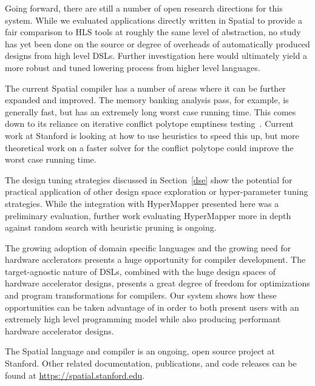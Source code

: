 Going forward, there are still a number of open research directions for this system.
While we evaluated applications directly written in Spatial to provide a fair
comparison to HLS tools at roughly the same level of abstraction, no study has yet
been done on the source or degree of overheads of automatically produced designs
from high level DSLs. Further investigation here would ultimately yield a more robust
and tuned lowering process from higher level languages.

The current Spatial compiler has a number of areas where it can be further expanded and
improved. The memory banking analysis pass, for example, is generally fast, but has
an extremely long worst case running time. This comes down to its reliance on
iterative conflict polytope emptiness testing~\cite{Wang_banking}. Current work
at Stanford is looking at how to use heuristics to speed this up, but more theoretical
work on a faster solver for the conflict polytope could improve the worst case running time.

The design tuning strategies discussed in Section~\ref{dse} show the potential for
practical application of other design space exploration or hyper-parameter tuning
strategies. While the integration with HyperMapper presented here was a preliminary
evaluation, further work evaluating HyperMapper more in depth against random search
with heuristic pruning is ongoing.

The growing adoption of domain specific languages and the growing need for hardware
acclerators presents a huge opportunity for compiler development. The target-agnostic
nature of DSLs, combined with the huge design spaces of hardware accelerator designs,
presents a great degree of freedom for optimizations and program transformations
for compilers. Our system shows how these opportunities can be taken advantage of
in order to both present users with an extremely high level programming model while
also producing performant hardware accelerator designs.

The Spatial language and compiler is an ongoing, open source project at Stanford.
Other related documentation, publications, and code releases can be found
at \url{https://spatial.stanford.edu}.
